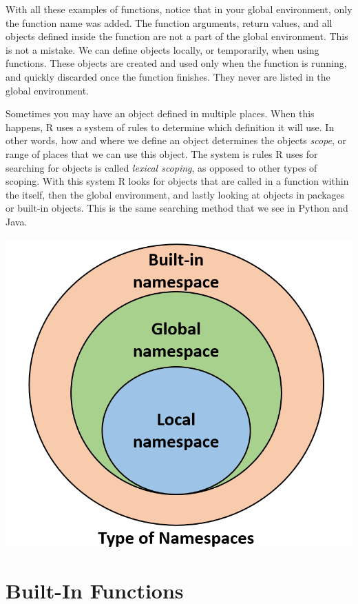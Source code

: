 \documentclass[
]{book}
\begin{document}
With all these examples of functions, notice that in your global environment, only the function name was added. The function arguments, return values, and all objects defined inside the function are not a part of the global environment. This is not a mistake. We can define objects locally, or temporarily, when using functions. These objects are created and used only when the function is running, and quickly discarded once the function finishes. They never are listed in the global environment.

Sometimes you may have an object defined in multiple places. When this happens, R uses a system of rules to determine which definition it will use. In other words, how and where we define an object determines the objects \emph{scope}, or range of places that we can use this object. The system is rules R uses for searching for objects is called \emph{lexical scoping}, as opposed to other types of scoping. With this system R looks for objects that are called in a function within the itself, then the global environment, and lastly looking at objects in packages or built-in objects. This is the same searching method that we see in Python and Java.

\includegraphics[width=11.29in]{images/types_namespace}

\hypertarget{built-in-functions}{%
\section{Built-In Functions}\label{built-in-functions}}
\end{document}
